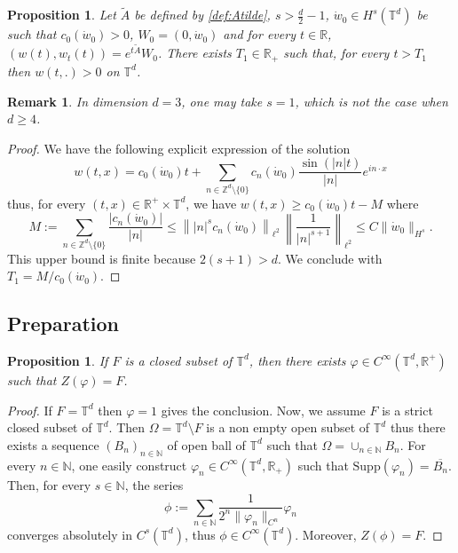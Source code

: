 \documentclass[a4paper]{article}
\theoremstyle{plain}
\newtheorem{remark}[theorem]{Remark}
\newtheorem{proposition}[theorem]{Proposition}
\newcommand{\T}{\mathbb{T}}
\newcommand{\R}{\mathbb{R}}
\begin{document}
\begin{proposition} \label{Prop:profile>0}
    Let 
    $\widetilde{A}$ be defined by \eqref{def:Atilde},
    $s>\frac{d}{2}-1$, 
    $\dot{w}_0 \in H^{s}(\T^d)$ be such that $c_0(\dot{w}_0) > 0$,
    $W_0=(0,\dot{w}_0)$ and 
    for every $t \in \R$, $(w(t),w_t(t))=e^{t\widetilde{A}} W_0$. 
    There exists $T_1 \in \R_+$ such that, for every $t>T_1$ then $w(t,.)>0$ on $\T^d$.
\end{proposition}

\begin{remark}
    In dimension $d=3$, one may take $s=1$, which is not the case when $d \geq 4$. 
\end{remark}

\begin{proof}
We have the following explicit expression of the solution
$$ w(t,x)=c_0(\dot{w}_0) t + \sum_{n\in\mathbb{Z}^d \setminus \{0\}} c_n(\dot{w}_0) \frac{\sin(|n|t)}{|n|} e^{i n \cdot x} $$
thus, for every $(t,x) \in \R^+ \times \T^d$, we have
$w(t,x) \geq c_0(\dot{w}_0) t  - M$ where
$$M:= \sum_{n\in\mathbb{Z}^d \setminus \{0\}}  \frac{|c_n(\dot{w}_0)|}{|n|} 
\leq 
\left\| |n|^s c_n(\dot{w}_0) \right\|_{\ell^2} \, 
\left\| \frac{1}{|n|^{s+1}} \right\|_{\ell^2}
\leq C \| \dot{w}_0 \|_{H^s}.$$
This upper bound is finite because $2(s+1)>d$.
We conclude with $T_1=M/c_0(\dot{w}_0)$.
\end{proof}




\subsection{Preparation}
\label{subsec:LT2}



\begin{proposition} \label{Prop:F_phi}
If $F$ is a closed subset of $\mathbb{T}^d$, then there exists $\varphi \in C^{\infty}(\T^d,\R^+)$ such that $Z(\varphi)=F$.
\end{proposition}

\begin{proof}
If $F=\T^d$ then $\varphi=1$ gives the conclusion. Now, we assume $F$ is a strict closed subset of $\T^d$. Then $\Omega=\T^d \setminus F$ is a non empty open subset of $\T^d$ thus there exists a sequence $(B_n)_{n\in\mathbb{N}}$ of open ball of $\T^d$ such that $\Omega = \cup_{n\in\mathbb{N}} B_n$. For every $n \in \mathbb{N}$, one easily construct $\varphi_n \in C^{\infty}(\T^d,\R_+)$ such that $\text{Supp}(\varphi_n)=\overline{B_n}$. Then, for every $s\in\mathbb{N}$, the series
$$\phi := \sum_{n\in\mathbb{N}} \frac{1}{2^n \|\varphi_n\|_{C^n}} \varphi_n $$
converges absolutely in $C^s(\T^d)$, thus $\phi \in C^{\infty}(\T^d)$. Moreover, $Z(\phi)=F$.
\end{proof}
\end{document}
